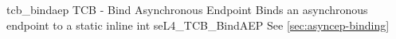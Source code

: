 %
%
%
%

\apidoc
{tcb_bindaep}
{TCB - Bind Asynchronous Endpoint}
{Binds an asynchronous endpoint to a  }
{static inline int seL4\_TCB\_BindAEP}
{
}
{\errorenumdesc}
{See \autoref{sec:asyncep-binding}}
